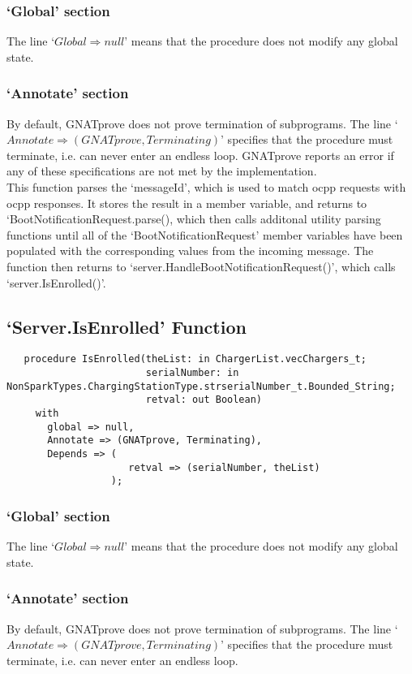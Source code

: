 \documentclass[12pt,openany,a4paper]{book}
\begin{document}
\subsubsection{`Global' section}
The line `$Global \Rightarrow null$' means that the procedure does not modify any global state.
\subsubsection{`Annotate' section}
By default, GNATprove does not prove termination of subprograms. The line `$Annotate \Rightarrow (GNATprove, Terminating)$' specifies that the procedure must terminate, i.e. can never enter an endless loop. 
GNATprove reports an error if any of these specifications are not met by the implementation.\\

This function parses the `messageId', which is used to match ocpp requests with ocpp responses. It stores the result in a member variable, and returns to `BootNotificationRequest.parse(), which then calls additonal utility parsing functions until all of the `BootNotificationRequest' member variables have been populated with the corresponding values from the incoming message. The function then returns to `server.HandleBootNotificationRequest()', which calls `server.IsEnrolled()'.\\



\subsection{`Server.IsEnrolled' Function}
\begin{verbatim}
   procedure IsEnrolled(theList: in ChargerList.vecChargers_t;
                        serialNumber: in NonSparkTypes.ChargingStationType.strserialNumber_t.Bounded_String;
                        retval: out Boolean)
     with
       global => null,
       Annotate => (GNATprove, Terminating),
       Depends => (
                     retval => (serialNumber, theList)
                  );

\end{verbatim}
\subsubsection{`Global' section}
The line `$Global \Rightarrow null$' means that the procedure does not modify any global state.
\subsubsection{`Annotate' section}
By default, GNATprove does not prove termination of subprograms. The line `$Annotate \Rightarrow (GNATprove, Terminating)$' specifies that the procedure must terminate, i.e. can never enter an endless loop. 
\end{document}
